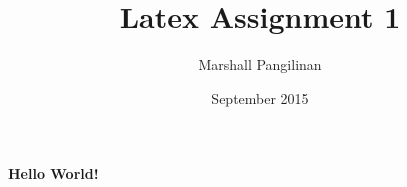 \documentclass{article}
\title{Latex Assignment 1}
\author{Marshall Pangilinan}
\date{September 2015}
\begin{document}
\maketitle
\newpage

\paragraph{Hello World!}
\end{document}
